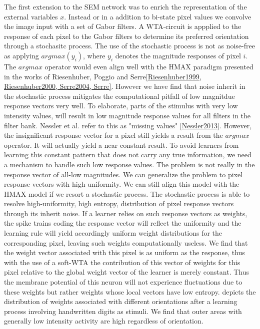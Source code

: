 \documentclass{report}
\begin{document}
The first extension to the SEM network was to enrich the representation of the external variables $x$. Instead or in a addition to bi-state pixel values we convolve the image input with a set of Gabor filters. A WTA-circuit is appplied to the response of each pixel to the Gabor filters to determine its preferred orientation through a stochasitc process. The use of the stochastic process is not as noise-free as applying $argmax(y_i)$, where $y_i$ denotes the magnitude responses of pixel $i$. The $argmax$ operator would even align well with the HMAX paradigm presented in the works of Riesenhuber, Poggio and Serre\cref{Riesenhuber1999, Riesenhuber2000, Serre2004, Serre}. However we have find that noise inherit in the stochastic process mitigates the computational pitfall of low magnitdue response vectors very well. To elaborate, parts of the stimulus with very low intensity values, will result in low magnitude response values for all filters in the filter bank. Nessler et al. refer to this as "missing values" \cref{Nessler2013}. However, the insignificant response vector for a pixel still yields a result from the $argmax$ operator. It will actually yield a near constant result. To avoid learners from learning this constant pattern that does not carry any true information, we need a mechanism to handle such low response values. The problem is not really in the response vector of all-low magnitudes. We can generalize the problem to pixel response vectors with high uniformity. We can still align this model with the HMAX model if we resort a stochastic process. The stochastic process is able to resolve high-uniformity, high entropy, distribution of pixel response vectors through its inherit noise. If a learner relies on such response vectors as weights, the spike trains coding the response vector will reflect the uniformity and the learning rule will yield accordingly uniform weight distributions for the corresponding pixel, leaving such weights computationally useless. We find that the weight vector associated with this pixel is as uniform as the response, thus with the use of a soft-WTA the contribution of this vector of weights for this pixel relative to the global weight vector of the learner is merely constant. Thus the membrane potential of this neuron will not experience fluctuations due to these weights but rather weights whose local vectors have low entropy.  depicts the distribution of weights associated with different orientations after a learning process involving handwritten digits as stimuli. We find that outer areas with generally low intensity activity are high regardless of orientation.
\end{document}
